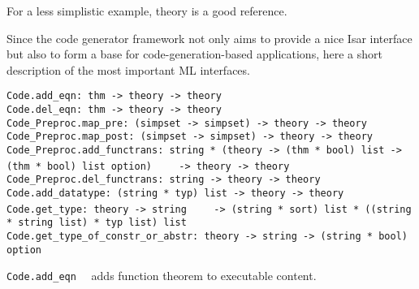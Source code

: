 \begin{isabellebody}
\begin{isamarkuptext}
  For a less simplistic example, theory \hyperlink{theory.Ferrack}{\mbox{}} is
  a good reference.%
\end{isamarkuptext}%
\isamarkuptrue%
%
\isamarkuptrue%
%
\begin{isamarkuptext}%
Since the code generator framework not only aims to provide
  a nice Isar interface but also to form a base for
  code-generation-based applications, here a short
  description of the most important ML interfaces.%
\end{isamarkuptext}%
\isamarkuptrue%
%
\isamarkuptrue%
%
\isadelimmlref
%
\endisadelimmlref
%
\isatagmlref
%
\begin{isamarkuptext}%
\begin{mldecls}
  \verb|Code.add_eqn: thm -> theory -> theory| \\
  \verb|Code.del_eqn: thm -> theory -> theory| \\
  \verb|Code_Preproc.map_pre: (simpset -> simpset) -> theory -> theory| \\
  \verb|Code_Preproc.map_post: (simpset -> simpset) -> theory -> theory| \\
  \verb|Code_Preproc.add_functrans: string * (theory -> (thm * bool) list -> (thm * bool) list option)|\isasep\isanewline%
\verb|    -> theory -> theory| \\
  \verb|Code_Preproc.del_functrans: string -> theory -> theory| \\
  \verb|Code.add_datatype: (string * typ) list -> theory -> theory| \\
  \verb|Code.get_type: theory -> string|\isasep\isanewline%
\verb|    -> (string * sort) list * ((string * string list) * typ list) list| \\
  \verb|Code.get_type_of_constr_or_abstr: theory -> string -> (string * bool) option|
  \end{mldecls}

  \begin{description}

  \item \verb|Code.add_eqn|~~ adds function
     theorem  to executable content.


\end{description}
\end{isamarkuptext}
\end{isabellebody}

